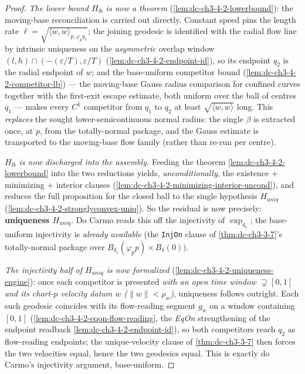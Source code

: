 \begin{proof}
  \emph{The lower bound $H_{lb}$ is now a theorem} (\cref{lem:dc-ch3-4-2-lowerbound}): the
  moving-base reconciliation is carried out directly. Constant speed pins the length rate
  $\ell=\sqrt{\langle w,w\rangle_{p,\varphi_p q_1}}$; the joining geodesic is identified with the
  radial flow line by intrinsic uniqueness on the \emph{asymmetric} overlap window
  $(l,h)\cap(-(\varepsilon/T),\varepsilon/T)$ (\cref{lem:dc-ch3-4-2-endpoint-id}), so its endpoint
  $q_2$ is the radial endpoint of $w$; and the base-uniform competitor bound
  (\cref{lem:dc-ch3-4-2-competitor-lb}) --- the moving-base Gauss radius comparison for confined
  curves together with the first-exit escape estimate, both uniform over the ball of centres $q_1$ ---
  makes every $C^1$ competitor from $q_1$ to $q_2$ at least $\sqrt{\langle w,w\rangle}$ long. This
  \emph{replaces} the sought lower-semicontinuous normal radius: the single $\beta$ is extracted once,
  at $p$, from the totally-normal package, and the Gauss estimate is transported to the moving-base
  flow family (rather than re-run per centre).

  \emph{$H_{lb}$ is now discharged into the assembly.} Feeding the theorem
  \cref{lem:dc-ch3-4-2-lowerbound} into the two reductions yields, \emph{unconditionally}, the
  existence + minimizing + interior clauses (\cref{lem:dc-ch3-4-2-minimizing-interior-uncond}), and
  reduces the full proposition for the closed ball to the single hypothesis $H_{uniq}$
  (\cref{lem:dc-ch3-4-2-stronglyconvex-uniq}). So the residual is now precisely: \textbf{uniqueness
  $H_{uniq}$}. Do Carmo reads this off the injectivity of $\exp_{q_1}$; the base-uniform injectivity
  is \emph{already available} (the \texttt{InjOn} clause of \cref{thm:dc-ch3-3-7}'s totally-normal
  package over $B_{\delta_1}(\varphi_p p)\times B_\delta(0)$).

  \emph{The injectivity half of $H_{uniq}$ is now formalized}
  (\cref{lem:dc-ch3-4-2-uniqueness-engine}): once each competitor is presented \emph{with an open time
  window $\supsetneq[0,1]$ and its chart-$p$ velocity datum $w$ ($\|w\|<\rho_w$)}, uniqueness follows
  outright. Each such geodesic coincides with its flow-reading segment $g_w$ on a window containing
  $[0,1]$ (\cref{lem:dc-ch3-4-2-eqon-flow-reading}, the \emph{EqOn} strengthening of the endpoint
  readback \cref{lem:dc-ch3-4-2-endpoint-id}), so both competitors reach $q_2$ as flow-reading
  endpoints; the unique-velocity clause of \cref{thm:dc-ch3-3-7} then forces the two velocities equal,
  hence the two geodesics equal. This is exactly do Carmo's injectivity argument, base-uniform.


\end{proof}
